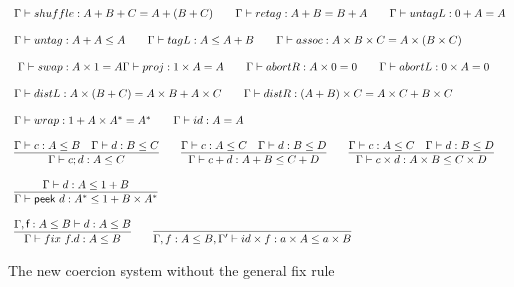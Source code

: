 \documentclass[a4paper,UKenglish,cleveref, autoref, thm-restate]{lipics-v2021}
\begin{document}
\begin{figure}
\caption{The new coercion system without the general fix rule}
\label{fig:system}
\centering
\begin{displaymath}
\begin{array}{lll}
\myaxiomC{shuffle}{A + B + C}{A + (B + C)} \qquad  
\myaxiomC{retag}{A + B}{B + A} \qquad 
\myaxiomC{untagL}{0 + A}{A} 
\\\\
\containsG{untag}{A + A}{A}   \qquad \containsG{tagL}{A}{A + B} \qquad

\myaxiomC{assoc}{A \times B \times C}{A \times (B \times C)}
\\\\\
\myaxiomC{swap}{A \times 1}{A} 
\myaxiomC{proj}{1 \times A}{A} \qquad
\myaxiomC{abortR}{A \times 0}{0} \qquad
\myaxiomC{abortL}{0 \times A}{0} 
\\\\
\myaxiomC{distL}{A \times (B + C)} {A \times B + A \times C} \qquad
\myaxiomC{distR}{(A + B)\times C}{A \times C + B \times C} 
\\\\
\myaxiomC{wrap}{1 + A \times A^*}{A^* } \qquad \myaxiomC{id}{A}{A}
\\\\
\infer{\containsG{c;d}{A}{C}}{\containsG{c}{A}{B} & \containsG{d}{B}{C}} \qquad

\infer{\containsG{c + d}{A + B}{ C + D}}{\containsG{c}{A}{C} & \containsG{d}{B}{D}}  \qquad

\infer{\containsG{c \times d}{A \times B}{ C \times D}}{\containsG{c}{A}{C} & \containsG{d}{B}{D}} 
\\\\
\infer{\containsG{\dslcom{peek}~d}{A^*}{1 + B \times A^*}}{\containsG{d}{A}{1 + B}} \qquad
\\\\
\infer{\contains{\Gamma}{\fix ~f.d}{A}{B}}{ \contains{\Gamma, \dslcom{f}: A \leq B}{d}{A}{B}} \qquad
\infer{\contains{\Gamma, f : A \leq B, \Gamma'}{id \times f}{a \times A}{a \times B}}{}
\end{array}
\end{displaymath}
\end{figure}
\end{document}
